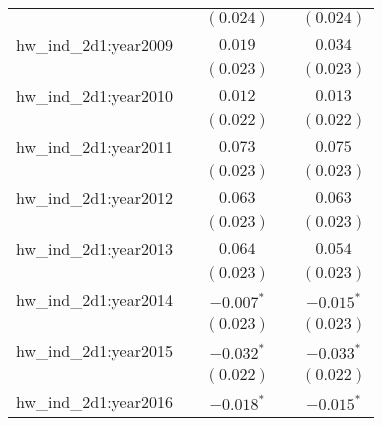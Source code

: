 \begin{center}
\begin{longtable}{l c c c c}
                         &                       & $(0.024)$             &                       & $(0.024)$             \\
hw\_ind\_2d1:year2009    &                       & $0.019$               &                       & $0.034$               \\
                         &                       & $(0.023)$             &                       & $(0.023)$             \\
hw\_ind\_2d1:year2010    &                       & $0.012$               &                       & $0.013$               \\
                         &                       & $(0.022)$             &                       & $(0.022)$             \\
hw\_ind\_2d1:year2011    &                       & $0.073$               &                       & $0.075$               \\
                         &                       & $(0.023)$             &                       & $(0.023)$             \\
hw\_ind\_2d1:year2012    &                       & $0.063$               &                       & $0.063$               \\
                         &                       & $(0.023)$             &                       & $(0.023)$             \\
hw\_ind\_2d1:year2013    &                       & $0.064$               &                       & $0.054$               \\
                         &                       & $(0.023)$             &                       & $(0.023)$             \\
hw\_ind\_2d1:year2014    &                       & $\mathbf{-0.007}^{*}$ &                       & $\mathbf{-0.015}^{*}$ \\
                         &                       & $(0.023)$             &                       & $(0.023)$             \\
hw\_ind\_2d1:year2015    &                       & $\mathbf{-0.032}^{*}$ &                       & $\mathbf{-0.033}^{*}$ \\
                         &                       & $(0.022)$             &                       & $(0.022)$             \\
hw\_ind\_2d1:year2016    &                       & $\mathbf{-0.018}^{*}$ &                       & $\mathbf{-0.015}^{*}$ \\

\end{longtable}
\end{center}
